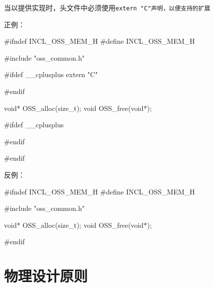 \begin{content}
\begin{regulation}
当以\clang{}提供实现时，头文件中必须使用\tt{extern "C"}声明，以便支持\cpp{}的扩展
\end{regulation}

正例：
\begin{leftbar}
\begin{c++}
#ifndef INCL_OSS_MEM_H
#define INCL_OSS_MEM_H

#include "oss_common.h"

#ifdef  __cplusplus
extern "C" {
#endif

void* OSS_alloc(size_t);
void  OSS_free(void*);

#ifdef  __cplusplus
}
#endif

#endif
\end{c++}
\end{leftbar}

反例：
\begin{leftbar}
\begin{c++}
#ifndef INCL_OSS_MEM_H
#define INCL_OSS_MEM_H

#include "oss_common.h"

void* OSS_alloc(size_t);
void  OSS_free(void*);

#endif
\end{c++}
\end{leftbar}

\end{content}

\section{物理设计原则}

